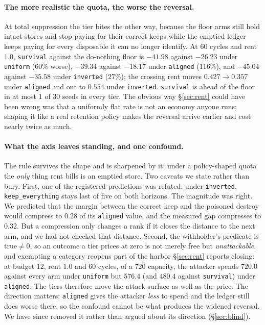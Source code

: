 \paragraph{The more realistic the quota, the worse the reversal.} At
total suppression the tier bites the other way, because the floor arms
still hold intact stores and stop paying for their correct keeps while
the emptied ledger keeps paying for every disposable it can no longer
identify. At 60 cycles and rent $1.0$, \texttt{survival} against the
do-nothing floor is $-41.98$ against $-26.23$ under \texttt{uniform}
($60\%$ worse), $-39.34$ against $-18.17$ under \texttt{aligned}
($116\%$), and $-45.04$ against $-35.58$ under \texttt{inverted}
($27\%$); the crossing rent moves $0.427 \rightarrow 0.357$ under
\texttt{aligned} and out to $0.554$ under \texttt{inverted}.
\texttt{survival} is ahead of the floor in at most $1$ of $30$ seeds in
every tier. The obvious way \S\ref{sec:rent} could have been wrong was
that a uniformly flat rate is not an economy anyone runs; shaping it
like a real retention policy makes the reversal arrive earlier and cost
nearly twice as much.

\paragraph{What the axis leaves standing, and one confound.} The rule
survives the shape and is sharpened by it: under a policy-shaped quota
the \emph{only} thing rent bills is an emptied store. Two caveats we
state rather than bury. First, one of the registered predictions was
refuted: under \texttt{inverted}, \texttt{keep\_everything} stays last
of five on both horizons. The magnitude was right. We predicted that
the margin between the correct keep and the poisoned destroy would
compress to $0.28$ of its \texttt{aligned} value, and the measured gap
compresses to $0.32$. But a compression only changes a rank if it
closes the distance to the next arm, and we had not checked that
distance. Second, the withholder's
predicate is $\text{true} \neq 0$, so an outcome a tier prices at zero
is not merely free but \emph{unattackable}, and exempting a category
reopens part of the harbor \S\ref{sec:rent} reports closing: at budget
12, rent $1.0$ and 60 cycles, of a $720$ capacity, the attacker spends
$720.0$ against every arm under \texttt{uniform} but $576.4$ (and
$480.4$ against \texttt{survival}) under \texttt{aligned}. The tiers
therefore move the attack surface as well as the price. The direction
matters: \texttt{aligned} gives the attacker \emph{less} to spend and
the ledger still does worse there, so the confound cannot be what
produces the widened reversal. We have since removed it rather than
argued about its direction (\S\ref{sec:blind}).


